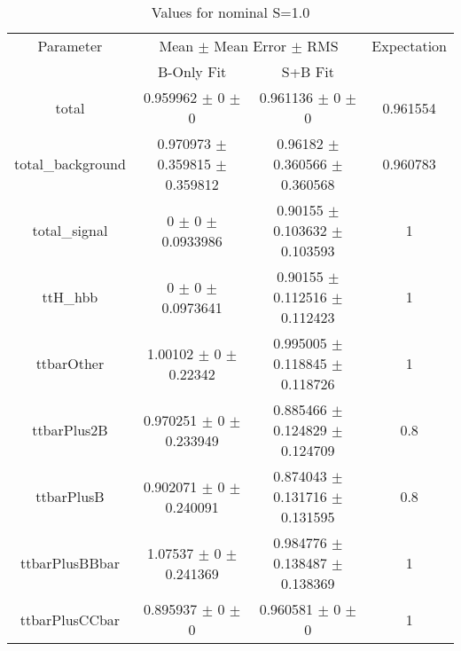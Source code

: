 \begin{table}
\centering
\caption{Values for nominal S=1.0}
\begin{tabular}{cccc}
\toprule
Parameter & \multicolumn{2}{c}{Mean $\pm$ Mean Error $\pm$ RMS} & Expectation\\
 & B-Only Fit & S+B Fit & \\
\midrule
total & \num{0.959962} $\pm$ \num{0} $\pm$ \num{0} & \num{0.961136} $\pm$ \num{0} $\pm$ \num{0} & \num{0.961554}\\
total\_background & \num{0.970973} $\pm$ \num{0.359815} $\pm$ \num{0.359812} & \num{0.96182} $\pm$ \num{0.360566} $\pm$ \num{0.360568} & \num{0.960783}\\
total\_signal & \num{0} $\pm$ \num{0} $\pm$ \num{0.0933986} & \num{0.90155} $\pm$ \num{0.103632} $\pm$ \num{0.103593} & \num{1}\\
ttH\_hbb & \num{0} $\pm$ \num{0} $\pm$ \num{0.0973641} & \num{0.90155} $\pm$ \num{0.112516} $\pm$ \num{0.112423} & \num{1}\\
ttbarOther & \num{1.00102} $\pm$ \num{0} $\pm$ \num{0.22342} & \num{0.995005} $\pm$ \num{0.118845} $\pm$ \num{0.118726} & \num{1}\\
ttbarPlus2B & \num{0.970251} $\pm$ \num{0} $\pm$ \num{0.233949} & \num{0.885466} $\pm$ \num{0.124829} $\pm$ \num{0.124709} & \num{0.8}\\
ttbarPlusB & \num{0.902071} $\pm$ \num{0} $\pm$ \num{0.240091} & \num{0.874043} $\pm$ \num{0.131716} $\pm$ \num{0.131595} & \num{0.8}\\
ttbarPlusBBbar & \num{1.07537} $\pm$ \num{0} $\pm$ \num{0.241369} & \num{0.984776} $\pm$ \num{0.138487} $\pm$ \num{0.138369} & \num{1}\\
ttbarPlusCCbar & \num{0.895937} $\pm$ \num{0} $\pm$ \num{0} & \num{0.960581} $\pm$ \num{0} $\pm$ \num{0} & \num{1}\\
\bottomrule
\end{tabular}
\end{table}